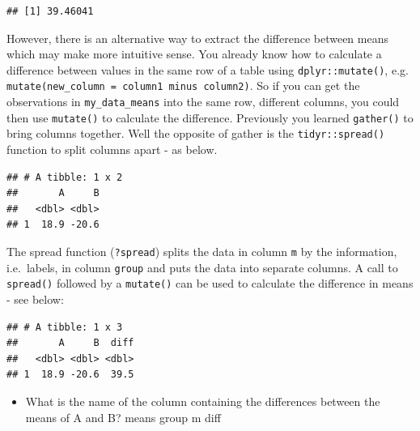 \documentclass[]{book}
\newenvironment{Shaded}{\begin{snugshade}}{\end{snugshade}}
\newcommand{\DataTypeTok}[1]{\textcolor[rgb]{0.13,0.29,0.53}{#1}}
\newcommand{\KeywordTok}[1]{\textcolor[rgb]{0.13,0.29,0.53}{\textbf{#1}}}
\newcommand{\NormalTok}[1]{#1}
\newcommand{\OperatorTok}[1]{\textcolor[rgb]{0.81,0.36,0.00}{\textbf{#1}}}
\newcommand{\StringTok}[1]{\textcolor[rgb]{0.31,0.60,0.02}{#1}}
\providecommand{\tightlist}{%
  \setlength{\itemsep}{0pt}\setlength{\parskip}{0pt}}
\begin{document}
\begin{verbatim}
## [1] 39.46041
\end{verbatim}

However, there is an alternative way to extract the difference between means which may make more intuitive sense. You already know how to calculate a difference between values in the same row of a table using \texttt{dplyr::mutate()}, e.g. \texttt{mutate(new\_column\ =\ column1\ minus\ column2)}. So if you can get the observations in \texttt{my\_data\_means} into the same row, different columns, you could then use \texttt{mutate()} to calculate the difference. Previously you learned \texttt{gather()} to bring columns together. Well the opposite of gather is the \texttt{tidyr::spread()} function to split columns apart - as below.

\begin{Shaded}
\end{Shaded}

\begin{verbatim}
## # A tibble: 1 x 2
##       A     B
##   <dbl> <dbl>
## 1  18.9 -20.6
\end{verbatim}

The spread function (\texttt{?spread}) splits the data in column \texttt{m} by the information, i.e.~labels, in column \texttt{group} and puts the data into separate columns. A call to \texttt{spread()} followed by a \texttt{mutate()} can be used to calculate the difference in means - see below:

\begin{Shaded}
\end{Shaded}

\begin{verbatim}
## # A tibble: 1 x 3
##       A     B  diff
##   <dbl> <dbl> <dbl>
## 1  18.9 -20.6  39.5
\end{verbatim}

\begin{itemize}
\tightlist
\item
  What is the name of the column containing the differences between the means of A and B? means group m diff
\end{itemize}
\end{document}
